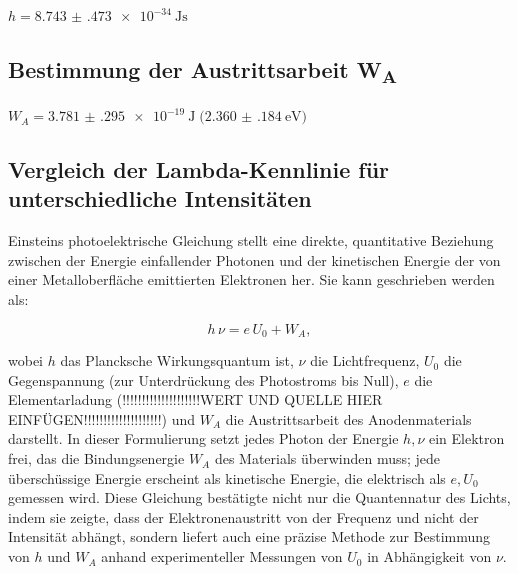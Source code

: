 \begin{table}[H]
\centering
{}
\caption{Ergebnisse des gewichteten linearen $\mathrm{\chi}^2$-Fits von $\overline{U_0}$ gegen $\nu$.}
\label{tab:U0_vs_nu_fit}
\end{table}
$h = \SI{8.743(473)e-34}{\joule\second}$


\subsection[Bestimmung der Austrittsarbeit WA]{Bestimmung der Austrittsarbeit W\textsubscript{A}}
$W_A = \SI{3.781(295)e-19}{\joule}\;\bigl(\SI{2.360(184)}{\electronvolt}\bigr)$
\subsection[Vergleich der Lambda-Kennlinie für unterschiedliche Intensitäten]{Vergleich der Lambda-Kennlinie für unterschiedliche Intensitäten}
Einsteins photoelektrische Gleichung stellt eine direkte, quantitative Beziehung zwischen der Energie einfallender Photonen und der kinetischen Energie der von einer Metalloberfläche emittierten Elektronen her. Sie kann geschrieben werden als:

\begin{equation}
    h\,\nu = e\,U_{0} + W_{A},
\end{equation}

wobei $h$ das Plancksche Wirkungsquantum ist, $\nu$ die Lichtfrequenz, $U_{0}$ die Gegenspannung (zur Unterdrückung des Photostroms bis Null), $e$ die Elementarladung (!!!!!!!!!!!!!!!!!!!!WERT UND QUELLE HIER EINFÜGEN!!!!!!!!!!!!!!!!!!!!) und $W_{A}$ die Austrittsarbeit des Anodenmaterials darstellt. In dieser Formulierung setzt jedes Photon der Energie $h,\nu$ ein Elektron frei, das die Bindungsenergie $W_{A}$ des Materials überwinden muss; jede überschüssige Energie erscheint als kinetische Energie, die elektrisch als $e,U_{0}$ gemessen wird. Diese Gleichung bestätigte nicht nur die Quanten­natur des Lichts, indem sie zeigte, dass der Elektronenaustritt von der Frequenz und nicht der Intensität abhängt, sondern liefert auch eine präzise Methode zur Bestimmung von $h$ und $W_{A}$ anhand experimenteller Messungen von $U_{0}$ in Abhängigkeit von $\nu$.

